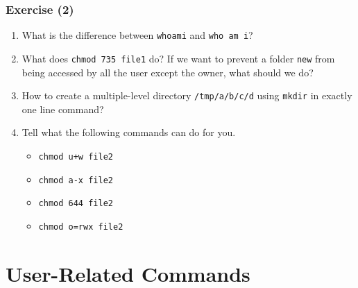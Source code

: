 \documentclass[red]{beamer}
\begin{document}
\begin{CJK*}{UTF8}{gbsn}
\begin{frame}[containsverbatim]
\frametitle{Exercise (2)}
\begin{enumerate}
	\item What is the difference between \lstinline{whoami} and \lstinline{who am i}?
	\item What does \lstinline{chmod 735 file1} do? If we want to prevent a
		folder \texttt{new} from being accessed by all the user except the
		owner, what should we do?
	\item How to create a multiple-level directory \texttt{/tmp/a/b/c/d} using
		\lstinline{mkdir} in exactly one line command?
	\item Tell what the following commands can do for you.
	\begin{itemize}
		\item \lstinline{chmod u+w file2}
		\item \lstinline{chmod a-x file2}
		\item \lstinline{chmod 644 file2}
		\item \lstinline{chmod o=rwx file2}
	\end{itemize}
\end{enumerate}
\end{frame}

\section{User-Related Commands}


\end{CJK*}
\end{document}
